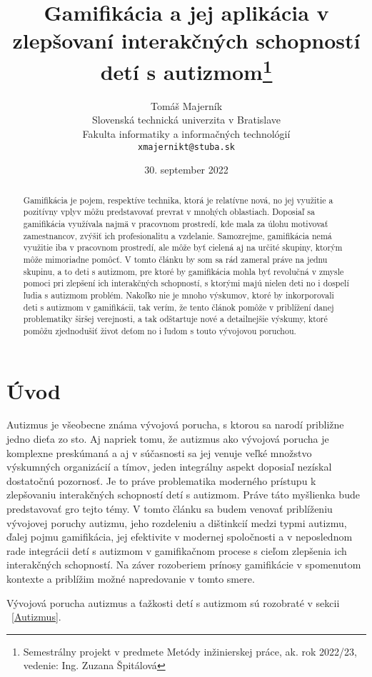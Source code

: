 \documentclass[10pt,twoside,slovak,a4paper]{coursepaper}
\title{Gamifikácia a jej aplikácia v zlepšovaní interakčných schopností detí s autizmom\thanks{Semestrálny projekt v predmete Metódy inžinierskej práce, ak. rok 2022/23, vedenie: Ing. Zuzana Špitálová}} %
\author{Tomáš Majerník\\[2pt]
	{\small Slovenská technická univerzita v Bratislave}\\
	{\small Fakulta informatiky a informačných technológií}\\
	{\small \texttt{xmajernikt@stuba.sk}}
	}
\date{\small 30. september 2022} %
\begin{document}
\maketitle

\begin{abstract}
Gamifikácia je pojem, respektíve technika, ktorá je relatívne nová, no jej využitie a pozitívny vplyv môžu predstavovať prevrat v mnohých oblastiach. Doposiaľ sa gamifikácia využívala najmä v pracovnom prostredí, kde mala za úlohu motivovať zamestnancov, zvýšiť ich profesionalitu a vzdelanie. Samozrejme, gamifikácia nemá využitie iba v pracovnom prostredí, ale môže byť cielená aj na určité skupiny, ktorým môže mimoriadne pomôcť. 
V tomto článku by som sa rád zameral práve na jednu skupinu, a to deti s autizmom, pre ktoré by gamifikácia mohla byť revolučná v zmysle pomoci pri zlepšení ich interakčných schopností, s ktorými majú nielen deti no i dospelí ľudia s autizmom problém. Nakoľko nie je mnoho výskumov, ktoré by inkorporovali deti s autizmom v gamifikácii, tak verím, že tento článok pomôže v priblížení danej problematiky širšej verejnosti, a tak odštartuje nové a detailnejšie výskumy, ktoré pomôžu zjednodušiť život deťom no i ľudom s touto vývojovou poruchou. 
\end{abstract}



\section{Úvod}

Autizmus je všeobecne známa vývojová porucha, s ktorou sa narodí približne jedno dieťa zo sto. Aj napriek tomu, že autizmus ako vývojová porucha je komplexne preskúmaná a aj v súčasnosti sa jej venuje veľké množstvo výskumných organizácií a tímov, jeden integrálny aspekt doposiaľ nezískal dostatočnú pozornosť. Je to práve problematika moderného prístupu k zlepšovaniu interakčných schopností detí s autizmom. Práve táto myšlienka bude predstavovať gro tejto témy. V tomto článku sa budem venovať priblíženiu vývojovej poruchy autizmu, jeho rozdeleniu a dištinkcií medzi typmi autizmu, ďalej pojmu gamifikácia, jej efektivite v modernej spoločnosti a v neposlednom rade integrácii detí s autizmom v gamifikačnom procese s cieľom zlepšenia ich interakčných schopností. Na záver rozoberiem prínosy gamifikácie v spomenutom kontexte a priblížim možné napredovanie v tomto smere.   

Vývojová porucha autizmus a ťažkosti detí s autizmom sú rozobraté v sekcii ~\ref{Autizmus}.
\end{document}
